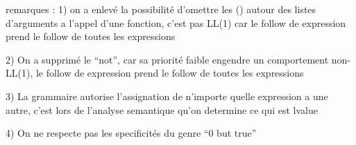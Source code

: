 \documentclass[a4paper,10pt]{article}
\begin{document}
remarques : 
1) on a enlevé la possibilité d'omettre les () autour des listes d'arguments a
l'appel d'une fonction, c'est pas LL(1) car le follow de expression prend le
follow de toutes les expressions

2) On a supprimé le ``not'', car sa priorité faible engendre un comportement
non-LL(1), le follow de expression prend le follow de toutes les expressions

3) La grammaire autorise l'assignation de n'importe quelle expression a une
autre, c'est lors de l'analyse semantique qu'on determine ce qui est lvalue

4) On ne respecte pas les specificités du genre ``0 but true''
\end{document}
